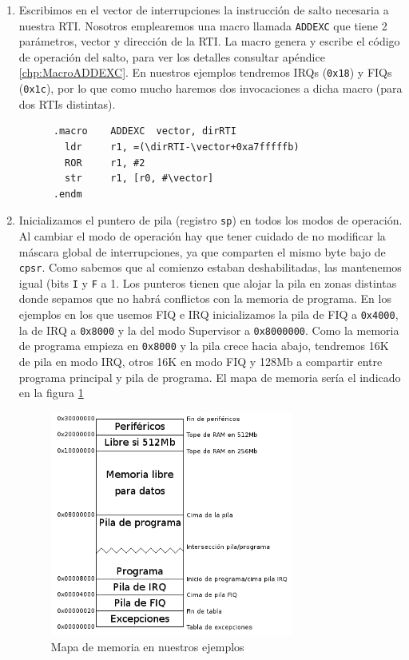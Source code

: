 \begin{enumerate}
  \item Escribimos en el vector de interrupciones la instrucción de salto necesaria a nuestra RTI.
        Nosotros emplearemos una macro llamada {\tt ADDEXC} que tiene 2 parámetros, vector y
        dirección de la RTI. La macro genera y escribe el código de operación
        del salto, para ver los detalles consultar apéndice \ref{chp:MacroADDEXC}.
        En nuestros ejemplos tendremos IRQs ({\tt 0x18}) y FIQs ({\tt 0x1c}), por
        lo que como mucho haremos dos invocaciones a dicha macro (para dos RTIs distintas).
\begin{lstlisting}
      .macro    ADDEXC  vector, dirRTI
        ldr     r1, =(\dirRTI-\vector+0xa7fffffb)
        ROR     r1, #2
        str     r1, [r0, #\vector]
      .endm
\end{lstlisting}
  \item Inicializamos el puntero de pila (registro {\tt sp}) en todos los modos de operación.
        Al cambiar el modo de operación hay que tener cuidado de no modificar la máscara
        global de interrupciones, ya que comparten el mismo byte bajo de {\tt cpsr}. Como
        sabemos que al comienzo estaban deshabilitadas, las mantenemos igual (bits {\tt I}
        y {\tt F} a 1.
        Los punteros tienen que alojar la pila en zonas distintas donde sepamos que no
        habrá conflictos con la memoria de programa. En los ejemplos en los que usemos FIQ e
        IRQ inicializamos la pila de FIQ
        a {\tt 0x4000}, la de IRQ a {\tt 0x8000} y la del modo Supervisor a {\tt 0x8000000}.
        Como la memoria de programa empieza en {\tt 0x8000} y la pila crece hacia abajo,
        tendremos 16K de pila en modo IRQ, otros 16K en modo FIQ y 128Mb a compartir entre
        programa principal y pila de programa. El mapa de memoria sería el indicado en la figura
        \ref{fig:mapamemoria}

\begin{figure}[h]
  \centering
    \includegraphics[width=8cm]{graphs/mapamemoria.png}
  \caption{Mapa de memoria en nuestros ejemplos}
  \label{fig:mapamemoria}
\end{figure}


\end{enumerate}
